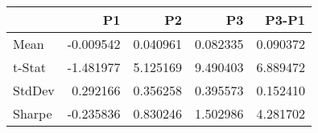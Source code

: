 \begin{tabular}{lrrrr}
\toprule
 & P1 & P2 & P3 & P3-P1 \\
\midrule
Mean & -0.009542 & 0.040961 & 0.082335 & 0.090372 \\
t-Stat & -1.481977 & 5.125169 & 9.490403 & 6.889472 \\
StdDev & 0.292166 & 0.356258 & 0.395573 & 0.152410 \\
Sharpe & -0.235836 & 0.830246 & 1.502986 & 4.281702 \\
\bottomrule
\end{tabular}
